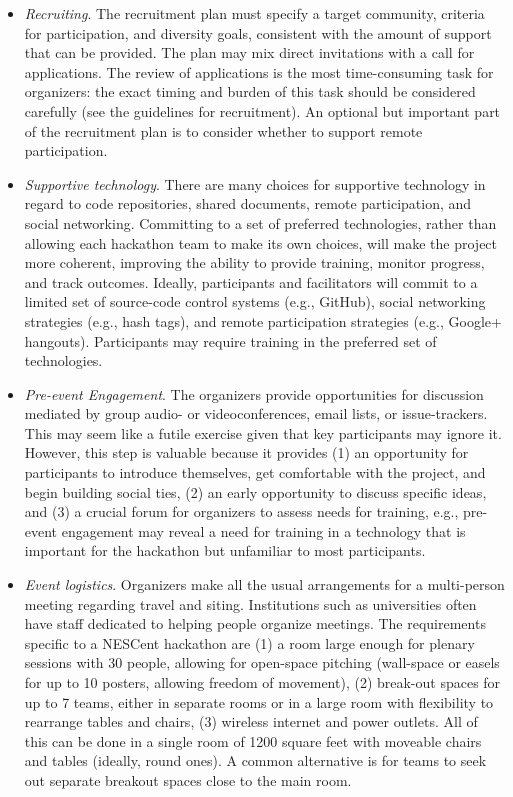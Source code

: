 \documentclass[11pt]{article}
\begin{document}
\begin{itemize}
\begin{itemize}
\item	{\em Recruiting}. The recruitment plan must specify a target community, criteria for participation, and diversity goals, consistent with the amount of support that can be provided. The plan may mix direct invitations with a call for applications. The review of applications is the most time-consuming task for organizers: the exact timing and burden of this task should be considered carefully (see the guidelines for recruitment). An optional but important part of the recruitment plan is to consider whether to support remote participation. 
\item	{\em Supportive technology}. There are many choices for supportive technology in regard to code repositories, shared documents, remote participation, and social networking. Committing to a set of preferred technologies, rather than allowing each hackathon team to make its own choices, will make the project more coherent, improving the ability to provide training, monitor progress, and track outcomes. Ideally, participants and facilitators will commit to a limited set of source-code control systems (e.g., GitHub), social networking strategies (e.g., hash tags), and remote participation strategies (e.g., Google+ hangouts). Participants may require training in the preferred set of technologies. 
\item	{\em Pre-event Engagement}. The organizers provide opportunities for discussion mediated by group audio- or videoconferences, email lists, or issue-trackers. This may seem like a futile exercise given that key participants may ignore it.  However, this step is valuable because it provides (1) an opportunity for participants to introduce themselves, get comfortable with the project, and begin building social ties, (2) an early opportunity to discuss specific ideas, and (3) a crucial forum for organizers to assess needs for training, e.g., pre-event engagement may reveal a need for training in a technology that is important for the hackathon but unfamiliar to most participants.  
\item	{\em Event logistics}. Organizers make all the usual arrangements for a multi-person meeting regarding travel and siting. Institutions such as universities often have staff dedicated to helping people organize meetings. The requirements specific to a NESCent hackathon are (1) a room large enough for plenary sessions with 30 people, allowing for open-space pitching (wall-space or easels for up to 10 posters, allowing freedom of movement), (2) break-out spaces for up to 7 teams, either in separate rooms or in a large room with flexibility to rearrange tables and chairs, (3) wireless internet and power outlets. All of this can be done in a single room of 1200 square feet with moveable chairs and tables (ideally, round ones). A common alternative is for teams to seek out separate breakout spaces close to the main room. 

\end{itemize}
\end{itemize}
\end{document}
